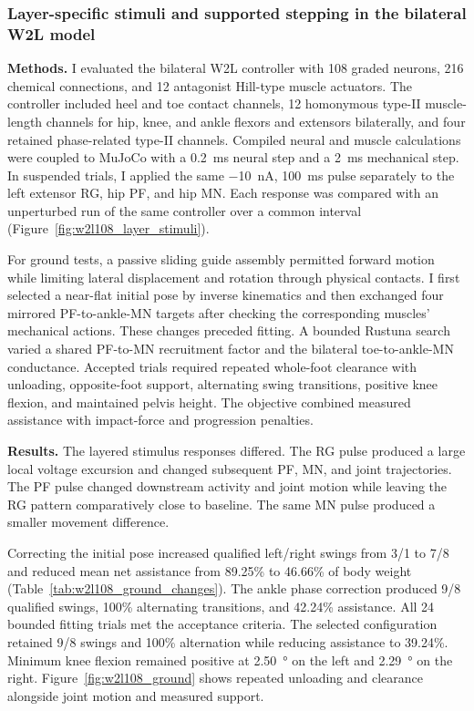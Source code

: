 \subsubsection{Layer-specific stimuli and supported stepping in the bilateral W2L model}

\noindent\textbf{Methods.}
I evaluated the bilateral W2L controller with 108 graded neurons, 216 chemical connections, and 12 antagonist Hill-type muscle actuators. The controller included heel and toe contact channels, 12 homonymous type-II muscle-length channels for hip, knee, and ankle flexors and extensors bilaterally, and four retained phase-related type-II channels. Compiled neural and muscle calculations were coupled to MuJoCo with a \qty{0.2}{\milli\second} neural step and a \qty{2}{\milli\second} mechanical step. In suspended trials, I applied the same \qty{-10}{\nano\ampere}, \qty{100}{\milli\second} pulse separately to the left extensor RG, hip PF, and hip MN. Each response was compared with an unperturbed run of the same controller over a common interval (Figure~\ref{fig:w2l108_layer_stimuli}).

For ground tests, a passive sliding guide assembly permitted forward motion while limiting lateral displacement and rotation through physical contacts. I first selected a near-flat initial pose by inverse kinematics and then exchanged four mirrored PF-to-ankle-MN targets after checking the corresponding muscles' mechanical actions. These changes preceded fitting. A bounded Rustuna search varied a shared PF-to-MN recruitment factor and the bilateral toe-to-ankle-MN conductance. Accepted trials required repeated whole-foot clearance with unloading, opposite-foot support, alternating swing transitions, positive knee flexion, and maintained pelvis height. The objective combined measured assistance with impact-force and progression penalties.

\noindent\textbf{Results.}
The layered stimulus responses differed. The RG pulse produced a large local voltage excursion and changed subsequent PF, MN, and joint trajectories. The PF pulse changed downstream activity and joint motion while leaving the RG pattern comparatively close to baseline. The same MN pulse produced a smaller movement difference.

Correcting the initial pose increased qualified left/right swings from 3/1 to 7/8 and reduced mean net assistance from 89.25\% to 46.66\% of body weight (Table~\ref{tab:w2l108_ground_changes}). The ankle phase correction produced 9/8 qualified swings, 100\% alternating transitions, and 42.24\% assistance. All 24 bounded fitting trials met the acceptance criteria. The selected configuration retained 9/8 swings and 100\% alternation while reducing assistance to 39.24\%. Minimum knee flexion remained positive at \qty{2.50}{\degree} on the left and \qty{2.29}{\degree} on the right. Figure~\ref{fig:w2l108_ground} shows repeated unloading and clearance alongside joint motion and measured support.

